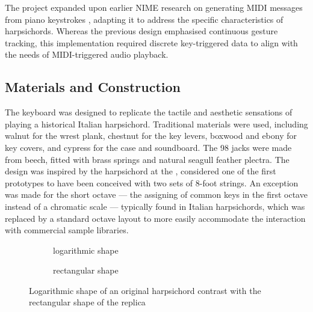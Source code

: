 The project expanded upon earlier NIME research on generating MIDI messages from piano keystrokes \cite{McPherson2013}, adapting it to address the specific characteristics of harpsichords. Whereas the previous design emphasised continuous gesture tracking, this implementation required discrete key-triggered data to align with the needs of MIDI-triggered audio playback. 

\subsection{Materials and Construction}
The keyboard was designed to replicate the tactile and aesthetic sensations of playing a historical Italian harpsichord. Traditional materials were used, including walnut for the wrest plank, chestnut for the key levers, boxwood and ebony for key covers, and cypress for the case and soundboard. The 98 jacks were made from beech, fitted with brass springs and natural seagull feather plectra. The design was inspired by the  harpsichord at the , considered one of the first prototypes to have been conceived with two sets of 8-foot strings. An exception was made for the short octave --- the assigning of common keys in the first octave instead of a chromatic scale --- typically found in Italian harpsichords, which was replaced by a standard octave layout to more easily accommodate the interaction with commercial sample libraries. 

\begin{figure}[!b]
    \centering
     \begin{subfigure}[h]{0.4\linewidth}
        \centering
                    
        \caption{logarithmic shape}    
        \label{fig:log-harp}
    \end{subfigure}

    
    \begin{subfigure}[h]{0.4\linewidth}
        \centering
                
        \caption{rectangular shape}
        \label{fig:rect-harp}
    \end{subfigure}
    \caption{Logarithmic shape of an original  harpsichord contrast with the rectangular shape of the replica}    
    \label{fig:log-harp-comp}
\end{figure}


